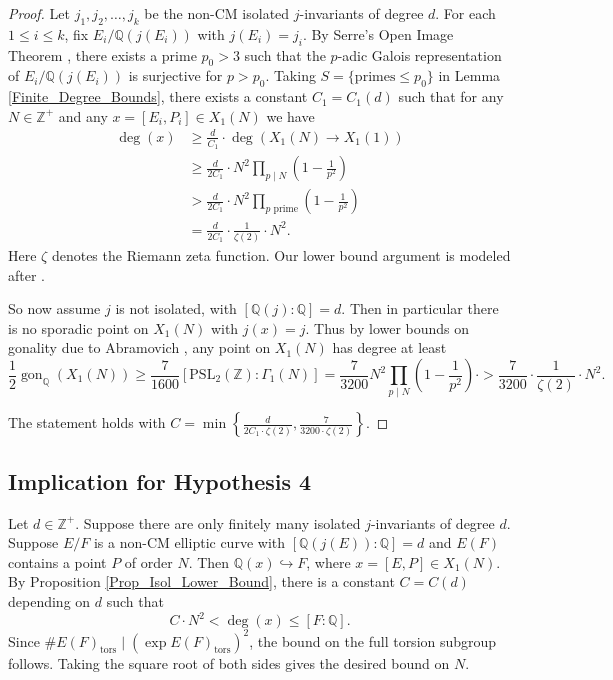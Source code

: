 \documentclass{amsart}
\theoremstyle{definition}
\newcommand{\tors}{\operatorname{tors}}
\newcommand{\gon}{\operatorname{gon}}
\newcommand{\Q}{\mathbb{Q}}
\newcommand{\Z}{\mathbb{Z}}
\begin{document}
\begin{proof}
    Let $j_1, j_2, \dots, j_k$ be the non-CM isolated $j$-invariants of degree $d$. For each $1 \leq i \leq k$, fix $E_i/\Q(j(E_i))$ with $j(E_i)=j_i$. By Serre's Open Image Theorem \cite{serre72}, there exists a prime $p_0>3$ such that the $p$-adic Galois representation of $E_i/\Q(j(E_i))$ is surjective for $p>p_0$. Taking $S=\{\text{primes} \leq p_0\}$ in Lemma \ref{Finite_Degree_Bounds}, there exists a constant $C_1=C_1(d)$ such that for any $N \in \mathbb{Z}^+$ and any $x=[E_i,P_i] \in X_1(N)$ we have 
    \begin{align*}
    \deg(x)&\geq \frac{d}{C_1} \cdot \deg(X_1(N) \rightarrow X_1(1))\\ &\geq\frac{d}{2 C_1} \cdot N^2 \prod_{p \mid N}\left( 1- \frac{1}{p^2} \right)\\
    & >\frac{d}{2 C_1} \cdot N^2 \prod_{p \text{ prime}}\left( 1- \frac{1}{p^2} \right) \\
    &=\frac{d}{2C_1}\cdot \frac{1}{\zeta(2)}\cdot N^2.
    \end{align*}
    Here $\zeta$ denotes the Riemann zeta function. Our lower bound argument is modeled after \cite[Proposition 5]{DedekindRef}.
    
    So now assume $j$ is not isolated, with $[\Q(j):\Q]=d$. Then in particular there is no sporadic point on $X_1(N)$ with $j(x)=j$. Thus by lower bounds on gonality due to Abramovich \cite{abramovich}, any point on $X_1(N)$ has degree at least \[\frac{1}{2}\gon_{\Q}(X_1(N)) \geq \frac{7}{1600}[\text{PSL}_2(\Z):\Gamma_1(N)]= \frac{7}{3200} N^2\prod_{p \mid N} \left(1-\frac{1}{p^2}\right) \cdot  >\frac{7}{3200}\cdot \frac{1}{\zeta(2) }\cdot N^2.\] 
    
   The statement holds with $C=\min\left\{\frac{d}{2C_1\cdot \zeta(2)},\frac{7}{3200\cdot \zeta(2)}\right\}$.
\end{proof}
\subsection{Implication for Hypothesis 4}
    Let $d\in \Z^+$. Suppose there are only finitely many isolated $j$-invariants of degree $d$. Suppose $E/F$ is a non-CM elliptic curve with $[\Q(j(E)):\Q]=d$ and $E(F)$ contains a point $P$ of order $N$. Then $\Q(x) \hookrightarrow F$, where $x=[E,P] \in X_1(N)$. By Proposition \ref{Prop_Isol_Lower_Bound}, there is a constant $C=C(d)$ depending on $d$ such that
    \[C\cdot N^2 < \deg(x) \leq [F:\Q].\]
 Since $\#E(F)_{\tors} \mid (\exp E(F)_{\tors})^2$, the bound on the full torsion subgroup follows. Taking the square root of both sides gives the desired bound on $N$.
\end{document}
